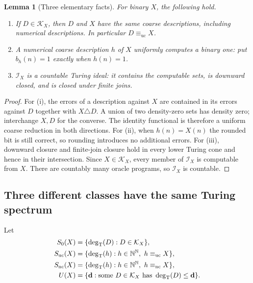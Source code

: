 \documentclass[11pt,a4paper]{article}
\newcommand{\N}{\mathbb N}
\newcommand{\Baire}{\N^{\N}}
\newcommand{\eqnc}{\equiv_{\mathrm{nc}}}
\newcommand{\equc}{\equiv_{\mathrm{uc}}}
\newcommand{\degT}{\operatorname{deg}_{\mathrm T}}
\newcommand{\Core}{\mathcal I}
\newtheorem{lemma}[theorem]{Lemma}
\theoremstyle{definition}\newtheorem{definition}[theorem]{Definition}
\theoremstyle{remark}\newtheorem{remark}[theorem]{Remark}
\begin{document}
\begin{lemma}[Three elementary facts]\label{lem:elementary}
For binary $X$, the following hold.
\begin{enumerate}[label=(\roman*)]
\item If $D\in\mathcal K_X$, then $D$ and $X$ have the same coarse descriptions, including numerical descriptions. In particular $D\equc X$.
\item A numerical coarse description $h$ of $X$ uniformly computes a binary one: put $b_h(n)=1$ exactly when $h(n)=1$.
\item $\Core_X$ is a countable Turing ideal: it contains the computable sets, is downward closed, and is closed under finite joins.
\end{enumerate}
\end{lemma}
\begin{proof}
For (i), the errors of a description against $X$ are contained in its errors against $D$ together with $X\triangle D$. A union of two density-zero sets has density zero; interchange $X,D$ for the converse. The identity functional is therefore a uniform coarse reduction in both directions. For (ii), when $h(n)=X(n)$ the rounded bit is still correct, so rounding introduces no additional errors. For (iii), downward closure and finite-join closure hold in every lower Turing cone and hence in their intersection. Since $X\in\mathcal K_X$, every member of $\Core_X$ is computable from $X$. There are countably many oracle programs, so $\Core_X$ is countable.
\end{proof}

\subsection{Three different classes have the same Turing spectrum}
Let
\begin{align*}
 S_0(X)&=\{\degT(D):D\in\mathcal K_X\},\\
 S_{\rm uc}(X)&=\{\degT(h):h\in\Baire,\ h\equc X\},\\
 S_{\rm nc}(X)&=\{\degT(h):h\in\Baire,\ h\eqnc X\},\\
 U(X)&=\{\mathbf d:\text{some }D\in\mathcal K_X\text{ has }\degT(D)\le\mathbf d\}.
\end{align*}
\end{document}
